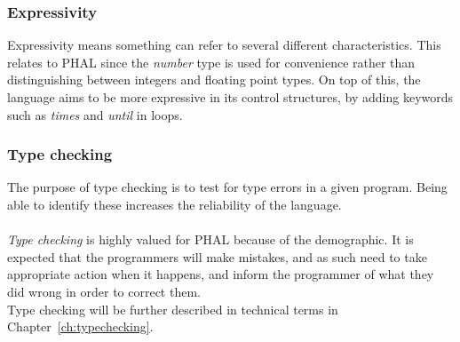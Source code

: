 \subsubsection{Expressivity}
Expressivity means something can refer to several different characteristics. This relates to PHAL since the \textit{number} type is used for convenience rather than distinguishing between integers and floating point types.
On top of this, the language aims to be more expressive in its control structures, by adding keywords such as \textit{times} and \textit{until} in loops.

\subsubsection{Type checking}
The purpose of type checking is to test for type errors in a given program. Being able to identify these increases the reliability of the language. 
\\\\
\textit{Type checking} is highly valued for PHAL because of the demographic. It is expected that the programmers will make mistakes, and as such need to take appropriate action when it happens, and inform the programmer of what they did wrong in order to correct them.
\\
Type checking will be further described in technical terms in Chapter~\ref{ch:typechecking}.

